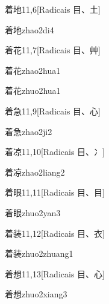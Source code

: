 \begin{entry}{着地}{11,6}[Radicais ⽬、⼟]
  \begin{phonetics}{着地}{zhao2di4}
  \end{phonetics}
\end{entry}

\begin{entry}{着花}{11,7}[Radicais ⽬、⾋]
  \begin{phonetics}{着花}{zhao2hua1}
  \end{phonetics}
  \begin{phonetics}{着花}{zhuo2hua1}
  \end{phonetics}
\end{entry}

\begin{entry}{着急}{11,9}[Radicais ⽬、⼼]
  \begin{phonetics}{着急}{zhao2ji2}
  \end{phonetics}
\end{entry}

\begin{entry}{着凉}{11,10}[Radicais ⽬、⼎]
  \begin{phonetics}{着凉}{zhao2liang2}
  \end{phonetics}
\end{entry}

\begin{entry}{着眼}{11,11}[Radicais ⽬、⽬]
  \begin{phonetics}{着眼}{zhuo2yan3}
  \end{phonetics}
\end{entry}

\begin{entry}{着装}{11,12}[Radicais ⽬、⾐]
  \begin{phonetics}{着装}{zhuo2zhuang1}
  \end{phonetics}
\end{entry}

\begin{entry}{着想}{11,13}[Radicais ⽬、⼼]
  \begin{phonetics}{着想}{zhuo2xiang3}
  \end{phonetics}
\end{entry}

